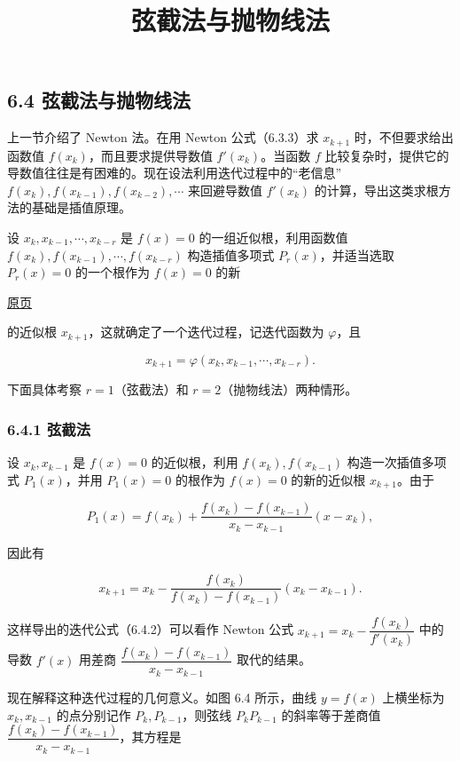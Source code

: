 \documentclass[
  10pt,
  fontset=fandol]{ctexart}
\title{弦截法与抛物线法}
\author{}
\date{}
\begin{document}
\maketitle

\subsection{6.4 弦截法与抛物线法}\label{ux5f26ux622aux6cd5ux4e0eux629bux7269ux7ebfux6cd5}

上一节介绍了 Newton 法。在用 Newton 公式（6.3.3）求 \(x_{k+1}\) 时，不但要求给出函数值 \(f(x_k)\)，而且要求提供导数值 \(f'(x_k)\)。当函数 \(f\) 比较复杂时，提供它的导数值往往是有困难的。现在设法利用迭代过程中的``老信息''\(f(x_k),f(x_{k-1}),f(x_{k-2}),\cdots\) 来回避导数值 \(f'(x_k)\) 的计算，导出这类求根方法的基础是插值原理。

设 \(x_k,x_{k-1},\cdots,x_{k-r}\) 是 \(f(x)=0\) 的一组近似根，利用函数值 \(f(x_k),f(x_{k-1}),\cdots,f(x_{k-r})\) 构造插值多项式 \(P_r(x)\)，并适当选取 \(P_r(x)=0\) 的一个根作为 \(f(x)=0\) 的新

\href{../../source-images/pdf-168.jpeg}{原页}

的近似根 \(x_{k+1}\)，这就确定了一个迭代过程，记迭代函数为 \(\varphi\)，且

\[
x_{k+1}=\varphi(x_k,x_{k-1},\cdots,x_{k-r}).
\]

下面具体考察 \(r=1\)（弦截法）和 \(r=2\)（抛物线法）两种情形。

\subsubsection{6.4.1 弦截法}\label{ux5f26ux622aux6cd5}

设 \(x_k,x_{k-1}\) 是 \(f(x)=0\) 的近似根，利用 \(f(x_k),f(x_{k-1})\) 构造一次插值多项式 \(P_1(x)\)，并用 \(P_1(x)=0\) 的根作为 \(f(x)=0\) 的新的近似根 \(x_{k+1}\)。由于

\[
P_1(x)=f(x_k)+\frac{f(x_k)-f(x_{k-1})}{x_k-x_{k-1}}(x-x_k),
\tag{6.4.1}
\]

因此有

\[
x_{k+1}=x_k-\frac{f(x_k)}{f(x_k)-f(x_{k-1})}(x_k-x_{k-1}).
\tag{6.4.2}
\]

这样导出的迭代公式（6.4.2）可以看作 Newton 公式 \(x_{k+1}=x_k-\dfrac{f(x_k)}{f'(x_k)}\) 中的导数 \(f'(x)\) 用差商 \(\dfrac{f(x_k)-f(x_{k-1})}{x_k-x_{k-1}}\) 取代的结果。

现在解释这种迭代过程的几何意义。如图 6.4 所示，曲线 \(y=f(x)\) 上横坐标为 \(x_k,x_{k-1}\) 的点分别记作 \(P_k,P_{k-1}\)，则弦线 \(P_kP_{k-1}\) 的斜率等于差商值 \(\dfrac{f(x_k)-f(x_{k-1})}{x_k-x_{k-1}}\)，其方程是
\end{document}
